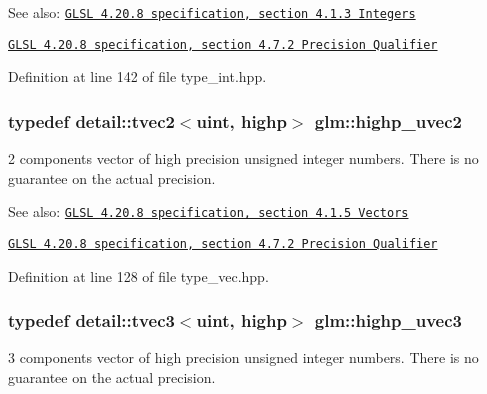 \begin{Desc}
\item[See also:]\href{http://www.opengl.org/registry/doc/GLSLangSpec.4.20.8.pdf}{\tt GLSL 4.20.8 specification, section 4.1.3 Integers} 

\href{http://www.opengl.org/registry/doc/GLSLangSpec.4.20.8.pdf}{\tt GLSL 4.20.8 specification, section 4.7.2 Precision Qualifier} \end{Desc}


Definition at line 142 of file type\_\-int.hpp.\hypertarget{group__core__precision_gaf92be4c1fca33cff90c1ed15b521c79}{
\subsubsection[highp\_\-uvec2]{\setlength{\rightskip}{0pt plus 5cm}typedef detail::tvec2$<$uint, highp$>$ {\bf glm::highp\_\-uvec2}}}
\label{group__core__precision_gaf92be4c1fca33cff90c1ed15b521c79}


2 components vector of high precision unsigned integer numbers. There is no guarantee on the actual precision.

\begin{Desc}
\item[See also:]\href{http://www.opengl.org/registry/doc/GLSLangSpec.4.20.8.pdf}{\tt GLSL 4.20.8 specification, section 4.1.5 Vectors} 

\href{http://www.opengl.org/registry/doc/GLSLangSpec.4.20.8.pdf}{\tt GLSL 4.20.8 specification, section 4.7.2 Precision Qualifier} \end{Desc}


Definition at line 128 of file type\_\-vec.hpp.\hypertarget{group__core__precision_g66d0e4ae1742ede2eb32bf0bfedd7474}{
\subsubsection[highp\_\-uvec3]{\setlength{\rightskip}{0pt plus 5cm}typedef detail::tvec3$<$uint, highp$>$ {\bf glm::highp\_\-uvec3}}}
\label{group__core__precision_g66d0e4ae1742ede2eb32bf0bfedd7474}


3 components vector of high precision unsigned integer numbers. There is no guarantee on the actual precision.


